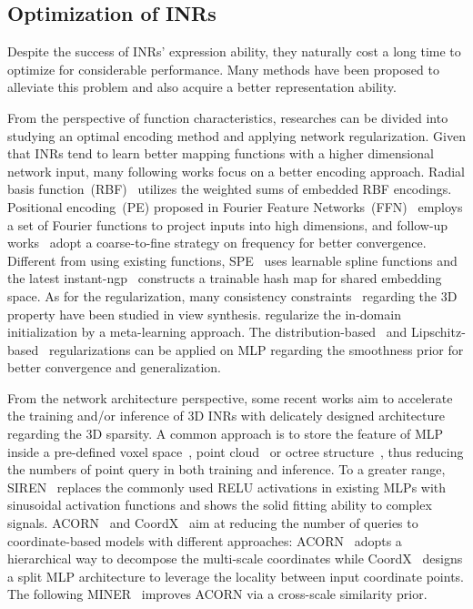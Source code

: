 \documentclass[runningheads]{llncs}
\begin{document}
\subsection{Optimization of INRs}

Despite the success of INRs' expression ability, they naturally cost a long time to optimize for considerable performance. Many methods have been proposed to alleviate this problem and also acquire a better representation ability.

From the perspective of function characteristics, researches can be divided into studying an optimal encoding method and applying network regularization. Given that INRs tend to learn better mapping functions with a higher dimensional network input, many following works focus on a better encoding approach. Radial basis function~(RBF)~\cite{dash2016radial} utilizes the weighted sums of embedded RBF encodings. Positional encoding~(PE) proposed in Fourier Feature Networks~(FFN)~\cite{tancik2020fourier} employs a set of Fourier functions to project inputs into high dimensions, and follow-up works~\cite{lin2021barf,hertz2021sape} adopt a coarse-to-fine strategy on frequency for better convergence. Different from using existing functions, SPE~\cite{wang2021spline} uses learnable spline functions and the latest instant-ngp~\cite{muller2022instant} constructs a trainable hash map for shared embedding space. As for the regularization, many consistency constraints~\cite{jain2021putting,deng2021depth,niemeyer2021regnerf} regarding the 3D property have been studied in view synthesis. \cite{tancik2021learned} regularize the in-domain initialization by a meta-learning approach. The distribution-based~\cite{ramasinghe2022regularizing} and Lipschitz-based~\cite{liu2022learning} regularizations can be applied on MLP regarding the smoothness prior for better convergence and generalization.

From the network architecture perspective, some recent works aim to accelerate the training and/or inference of 3D INRs with delicately designed architecture regarding the 3D sparsity. A common approach is to store the feature of MLP inside a pre-defined voxel space~\cite{liu2022learning}, point cloud~\cite{xu2022point} or octree structure~\cite{yu2021plenoctrees}, thus reducing the numbers of point query in both training and inference. To a greater range, SIREN~\cite{sitzmann2020implicit} replaces the commonly used RELU activations in existing MLPs with sinusoidal activation functions and shows the solid fitting ability to complex signals. ACORN~\cite{martel2021acorn} and CoordX~\cite{liang2022coordx} aim at reducing the number of queries to coordinate-based models with different approaches: ACORN~\cite{martel2021acorn} adopts a hierarchical way to decompose the multi-scale coordinates while CoordX~\cite{liang2022coordx} designs a split MLP architecture to leverage the locality between input coordinate points. The following MINER~\cite{saragadam2022miner} improves ACORN via a cross-scale similarity prior.
\end{document}
